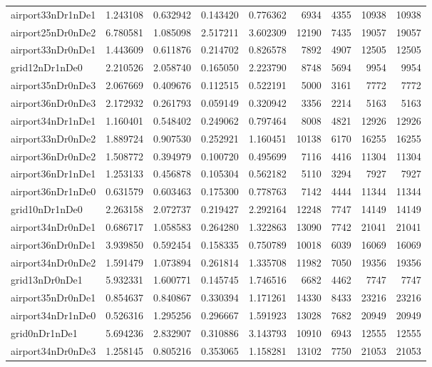 \begin{longtable}{|l|r|r|r|r|r|r|r|r|}
airport33nDr1nDe1 & 1.243108 & 0.632942 & 0.143420 & 0.776362 & 6934 & 4355 & 10938 & 10938 \\
airport25nDr0nDe2 & 6.780581 & 1.085098 & 2.517211 & 3.602309 & 12190 & 7435 & 19057 & 19057 \\
airport33nDr0nDe1 & 1.443609 & 0.611876 & 0.214702 & 0.826578 & 7892 & 4907 & 12505 & 12505 \\
grid12nDr1nDe0 & 2.210526 & 2.058740 & 0.165050 & 2.223790 & 8748 & 5694 & 9954 & 9954 \\
airport35nDr0nDe3 & 2.067669 & 0.409676 & 0.112515 & 0.522191 & 5000 & 3161 & 7772 & 7772 \\
airport36nDr0nDe3 & 2.172932 & 0.261793 & 0.059149 & 0.320942 & 3356 & 2214 & 5163 & 5163 \\
airport34nDr1nDe1 & 1.160401 & 0.548402 & 0.249062 & 0.797464 & 8008 & 4821 & 12926 & 12926 \\
airport33nDr0nDe2 & 1.889724 & 0.907530 & 0.252921 & 1.160451 & 10138 & 6170 & 16255 & 16255 \\
airport36nDr0nDe2 & 1.508772 & 0.394979 & 0.100720 & 0.495699 & 7116 & 4416 & 11304 & 11304 \\
airport36nDr1nDe1 & 1.253133 & 0.456878 & 0.105304 & 0.562182 & 5110 & 3294 & 7927 & 7927 \\
airport36nDr1nDe0 & 0.631579 & 0.603463 & 0.175300 & 0.778763 & 7142 & 4444 & 11344 & 11344 \\
grid10nDr1nDe0 & 2.263158 & 2.072737 & 0.219427 & 2.292164 & 12248 & 7747 & 14149 & 14149 \\
airport34nDr0nDe1 & 0.686717 & 1.058583 & 0.264280 & 1.322863 & 13090 & 7742 & 21041 & 21041 \\
airport36nDr0nDe1 & 3.939850 & 0.592454 & 0.158335 & 0.750789 & 10018 & 6039 & 16069 & 16069 \\
airport34nDr0nDe2 & 1.591479 & 1.073894 & 0.261814 & 1.335708 & 11982 & 7050 & 19356 & 19356 \\
grid13nDr0nDe1 & 5.932331 & 1.600771 & 0.145745 & 1.746516 & 6682 & 4462 & 7747 & 7747 \\
airport35nDr0nDe1 & 0.854637 & 0.840867 & 0.330394 & 1.171261 & 14330 & 8433 & 23216 & 23216 \\
airport34nDr1nDe0 & 0.526316 & 1.295256 & 0.296667 & 1.591923 & 13028 & 7682 & 20949 & 20949 \\
grid0nDr1nDe1 & 5.694236 & 2.832907 & 0.310886 & 3.143793 & 10910 & 6943 & 12555 & 12555 \\
airport34nDr0nDe3 & 1.258145 & 0.805216 & 0.353065 & 1.158281 & 13102 & 7750 & 21053 & 21053 \\

\end{longtable}
